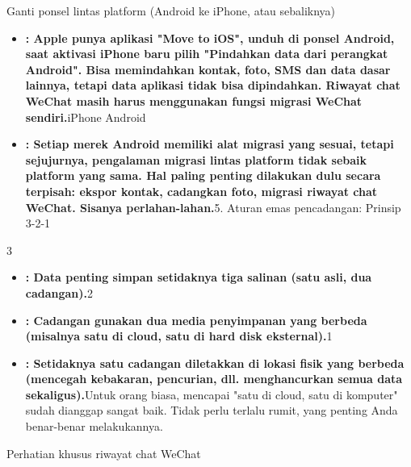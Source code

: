 
Ganti ponsel lintas platform (Android ke iPhone, atau sebaliknya)


\begin{itemize}
  \item \textbf{: Apple punya aplikasi "Move to iOS", unduh di ponsel Android, saat aktivasi iPhone baru pilih "Pindahkan data dari perangkat Android". Bisa memindahkan kontak, foto, SMS dan data dasar lainnya, tetapi data aplikasi tidak bisa dipindahkan. Riwayat chat WeChat masih harus menggunakan fungsi migrasi WeChat sendiri.}iPhone Android
  \item \textbf{: Setiap merek Android memiliki alat migrasi yang sesuai, tetapi sejujurnya, pengalaman migrasi lintas platform tidak sebaik platform yang sama. Hal paling penting dilakukan dulu secara terpisah: ekspor kontak, cadangkan foto, migrasi riwayat chat WeChat. Sisanya perlahan-lahan.}5. Aturan emas pencadangan: Prinsip 3-2-1
\end{itemize}


3

\begin{itemize}
  \item \textbf{: Data penting simpan setidaknya tiga salinan (satu asli, dua cadangan).}2
  \item \textbf{: Cadangan gunakan dua media penyimpanan yang berbeda (misalnya satu di cloud, satu di hard disk eksternal).}1
  \item \textbf{: Setidaknya satu cadangan diletakkan di lokasi fisik yang berbeda (mencegah kebakaran, pencurian, dll. menghancurkan semua data sekaligus).}Untuk orang biasa, mencapai "satu di cloud, satu di komputer" sudah dianggap sangat baik. Tidak perlu terlalu rumit, yang penting Anda benar-benar melakukannya.
\end{itemize}

Perhatian khusus riwayat chat WeChat

